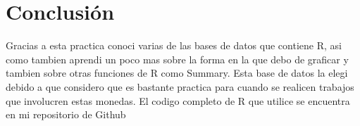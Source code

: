 \documentclass[12pt,a4paper]{article}
\begin{document}
\section{Conclusi\'{o}n}\label{sec:Con}
Gracias a esta practica conoci varias de las bases de datos que contiene R, asi como tambien aprendi un poco mas sobre la forma en la que debo de graficar y tambien sobre otras funciones de R como Summary. Esta base de datos la elegi debido a que considero que es bastante practica para cuando se realicen trabajos que involucren estas monedas. El codigo completo de R que utilice se encuentra en mi repositorio de Github \cite{repositorio}


\end{document}
